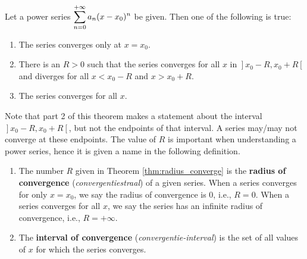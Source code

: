 \begin{theorem}\label{thm:radius_converge}
{\footnotesize $\,$}\\
\vspace*{-1.25cm}

Let a power series $\displaystyle \sum_{n=0}^{+\infty} a_n(x-x_0)^n$ be given. Then one of the following is true:
\begin{enumerate}
	\item The series converges only at $x=x_0$.
	\item	There is an $R>0$ such that the series converges for all $x$ in $\left.\right]x_0-R,x_0+R\left[\right.$ and diverges for all $x<x_0-R$ and $x>x_0+R$.
	\item	The series converges for all $x$.
\end{enumerate}
\end{theorem}

Note that part 2 of this theorem  makes a statement about the interval $\left.\right]x_0-R,x_0+R\left[\right.$, but not the endpoints of that interval. A series may/may not converge at these endpoints. The value of $R$ is important when understanding a power series, hence it is given a name in the following definition.


\begin{definition}\label{def:radius_converge}
 \begin{enumerate}
		\item The number $R$ given in Theorem \ref{thm:radius_converge} is the \textbf{radius of convergence} (\textit{convergentiestraal}) of a given series. When a series converges for only $x=x_0$, we say the radius of convergence is 0, i.e.,  $R=0$. When a series converges for all $x$, we say the series has an infinite radius of convergence, i.e., $R=+\infty$.
			\item	The \textbf{interval of convergence} (\textit{convergentie-interval}) is the set of all values of $x$ for which the series converges.
	\end{enumerate}
\end{definition}

\ifanalysis


